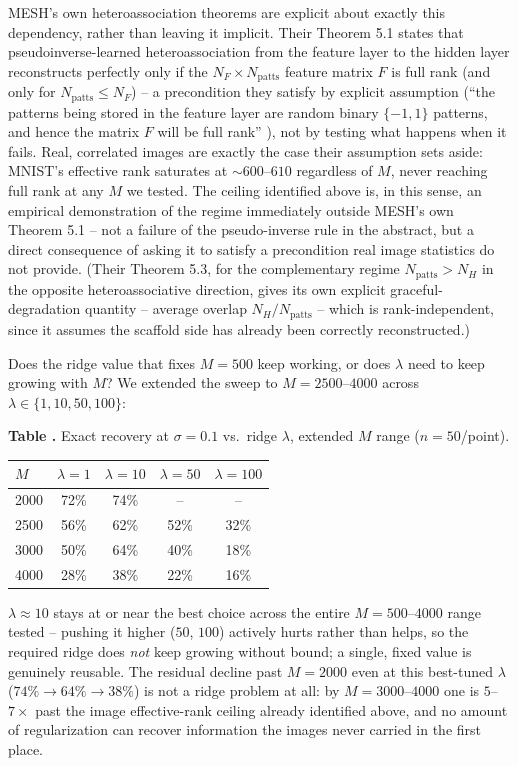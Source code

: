 \documentclass[11pt]{article}
\newcommand{\toprule}{\hline\hline}
\newcommand{\midrule}{\hline}
\newcommand{\bottomrule}{\hline\hline}
\begin{document}
MESH's own heteroassociation theorems are explicit about exactly this dependency, rather than
leaving it implicit. Their Theorem 5.1 states that pseudoinverse-learned heteroassociation from
the feature layer to the hidden layer reconstructs perfectly only if the $N_F \times N_{\mathrm{patts}}$
feature matrix $F$ is full rank (and only for $N_{\mathrm{patts}} \le N_F$) -- a precondition they
satisfy by explicit assumption (``the patterns being stored in the feature layer are random
binary $\{-1,1\}$ patterns, and hence the matrix $F$ will be full rank'' \cite{sharma2022}), not
by testing what happens when it fails. Real, correlated images are exactly the case their
assumption sets aside: MNIST's effective rank saturates at ${\sim}600$--$610$ regardless of $M$,
never reaching full rank at any $M$ we tested. The ceiling identified above is, in this sense, an
empirical demonstration of the regime immediately outside MESH's own Theorem 5.1 -- not a failure
of the pseudo-inverse rule in the abstract, but a direct consequence of asking it to satisfy a
precondition real image statistics do not provide. (Their Theorem 5.3, for the complementary
regime $N_{\mathrm{patts}} > N_H$ in the opposite heteroassociative direction, gives its own
explicit graceful-degradation quantity -- average overlap $N_H/N_{\mathrm{patts}}$ -- which is
rank-independent, since it assumes the scaffold side has already been correctly reconstructed.)

Does the ridge value that fixes $M{=}500$ keep working, or does $\lambda$ need to keep growing
with $M$? We extended the sweep to $M{=}2500$--$4000$ across $\lambda\in\{1,10,50,100\}$:

\label{tab:ridge-extended}
\noindent\textbf{Table \thetable.} Exact recovery at $\sigma{=}0.1$ vs.\ ridge $\lambda$, extended
$M$ range ($n{=}50$/point).
\begin{center}
\begin{tabular}{lcccc}
\toprule
$M$ & $\lambda{=}1$ & $\lambda{=}10$ & $\lambda{=}50$ & $\lambda{=}100$ \\
\midrule
2000 & 72\% & 74\% & --   & --   \\
2500 & 56\% & 62\% & 52\% & 32\% \\
3000 & 50\% & 64\% & 40\% & 18\% \\
4000 & 28\% & 38\% & 22\% & 16\% \\
\bottomrule
\end{tabular}
\end{center}

$\lambda{\approx}10$ stays at or near the best choice across the entire $M{=}500$--$4000$
range tested -- pushing it higher ($50$, $100$) actively hurts rather than helps, so the
required ridge does \emph{not} keep growing without bound; a single, fixed value is
genuinely reusable. The residual decline past $M{=}2000$ even at this best-tuned $\lambda$
($74\%\to64\%\to38\%$) is not a ridge problem at all: by $M{=}3000$--$4000$ one is
$5$--$7\times$ past the image effective-rank ceiling already identified above, and no amount
of regularization can recover information the images never carried in the first place.
\end{document}
